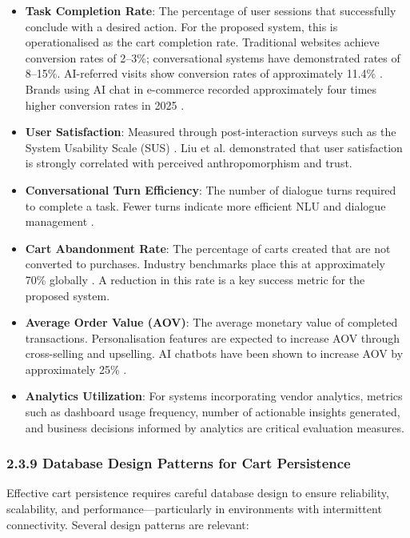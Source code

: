 \documentclass[12pt,a4paper]{article}
\begin{document}
\begin{itemize}
    \item \textbf{Task Completion Rate}: The percentage of user sessions that successfully conclude with a desired action. For the proposed system, this is operationalised as the cart completion rate. Traditional websites achieve conversion rates of 2--3\%; conversational systems have demonstrated rates of 8--15\%. AI-referred visits show conversion rates of approximately 11.4\% \citep{forrester2024}. Brands using AI chat in e-commerce recorded approximately four times higher conversion rates in 2025 \citep{gorgias2026}.
    \item \textbf{User Satisfaction}: Measured through post-interaction surveys such as the System Usability Scale (SUS) \citep{brooke1996}. Liu et al. \citep{liu2026} demonstrated that user satisfaction is strongly correlated with perceived anthropomorphism and trust.
    \item \textbf{Conversational Turn Efficiency}: The number of dialogue turns required to complete a task. Fewer turns indicate more efficient NLU and dialogue management \citep{jurafsky2023}.
    \item \textbf{Cart Abandonment Rate}: The percentage of carts created that are not converted to purchases. Industry benchmarks place this at approximately 70\% globally \citep{statista2024}. A reduction in this rate is a key success metric for the proposed system.
    \item \textbf{Average Order Value (AOV)}: The average monetary value of completed transactions. Personalisation features are expected to increase AOV through cross-selling and upselling. AI chatbots have been shown to increase AOV by approximately 25\% \citep{gorgias2026}.
    \item \textbf{Analytics Utilization}: For systems incorporating vendor analytics, metrics such as dashboard usage frequency, number of actionable insights generated, and business decisions informed by analytics are critical evaluation measures.
\end{itemize}

\subsubsection{2.3.9 Database Design Patterns for Cart Persistence}

Effective cart persistence requires careful database design to ensure reliability, scalability, and performance---particularly in environments with intermittent connectivity. Several design patterns are relevant:
\end{document}
